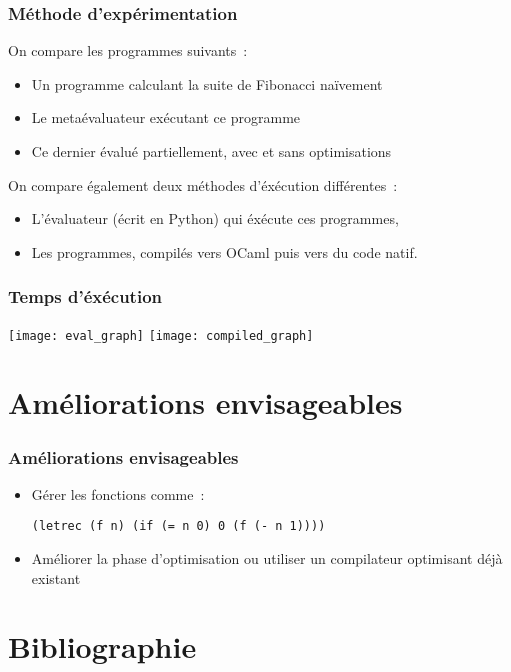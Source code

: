 \documentclass[mathserif]{beamer}
\begin{document}
\begin{frame}
\frametitle{Méthode d'expérimentation}

On compare les programmes suivants~:
\begin{itemize}
\item Un programme calculant la suite de Fibonacci naïvement
\item Le metaévaluateur exécutant ce programme
\item Ce dernier évalué partiellement, avec et sans optimisations
\end{itemize}
On compare également deux méthodes d'éxécution différentes~:
\begin{itemize}
\item L'évaluateur (écrit en Python) qui éxécute ces programmes,
\item Les programmes, compilés vers OCaml puis vers du code natif.
\end{itemize}

\end{frame}

\begin{frame}
\frametitle{Temps d'éxécution}
\texttt{[image: eval\_graph]}
\texttt{[image: compiled\_graph]}
\end{frame}

\section{Améliorations envisageables}

\begin{frame}[fragile]
\frametitle{Améliorations envisageables}

\begin{itemize}
\item Gérer les fonctions comme~:
\begin{lstlisting}
(letrec (f n) (if (= n 0) 0 (f (- n 1))))
\end{lstlisting}
\item Améliorer la phase d'optimisation ou utiliser un compilateur
optimisant déjà existant
\end{itemize}
\end{frame}

\section{Bibliographie}
\end{document}
